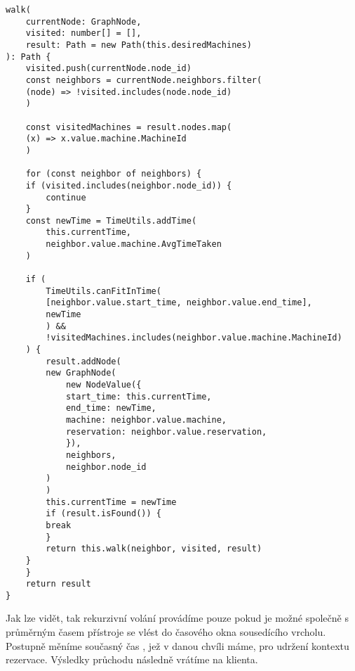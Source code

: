 \begin{lstlisting}
walk(
    currentNode: GraphNode,
    visited: number[] = [],
    result: Path = new Path(this.desiredMachines)
): Path {
    visited.push(currentNode.node_id)
    const neighbors = currentNode.neighbors.filter(
	(node) => !visited.includes(node.node_id)
    )

    const visitedMachines = result.nodes.map(
	(x) => x.value.machine.MachineId
    )

    for (const neighbor of neighbors) {
	if (visited.includes(neighbor.node_id)) {
	    continue
	}
	const newTime = TimeUtils.addTime(
	    this.currentTime,
	    neighbor.value.machine.AvgTimeTaken
	)

	if (
	    TimeUtils.canFitInTime(
		[neighbor.value.start_time, neighbor.value.end_time],
		newTime
	    ) &&
	    !visitedMachines.includes(neighbor.value.machine.MachineId)
	) {
	    result.addNode(
		new GraphNode(
		    new NodeValue({
			start_time: this.currentTime,
			end_time: newTime,
			machine: neighbor.value.machine,
			reservation: neighbor.value.reservation,
		    }),
		    neighbors,
		    neighbor.node_id
		)
	    )
	    this.currentTime = newTime
	    if (result.isFound()) {
		break
	    }
	    return this.walk(neighbor, visited, result)
	}
    }
    return result
}
\end{lstlisting}

Jak lze vidět, tak rekurzivní volání provádíme pouze pokud je možné společně s průměrným časem přístroje se vlést do časového okna sousedícího vrcholu. Postupně měníme současný čas , jež v danou chvíli máme, pro udržení kontextu rezervace. Výsledky průchodu následně vrátíme na klienta.

